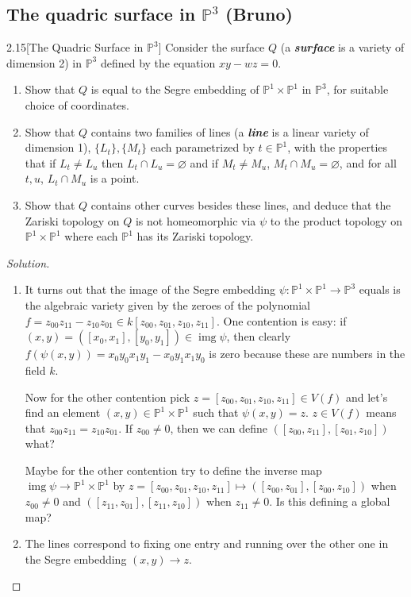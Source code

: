 \subsection{The quadric surface in $\mathbb{P}^3$ (Bruno)}

\begin{manualexercise}{2.15}[The Quadric Surface in $\mathbb{P}^3$]
	Consider the surface $Q$ (a \textbf{\textit{surface}} is a variety of dimension 2) in $\mathbb{P}^3$ defined by the equation $xy-wz=0$.
	\begin{enumerate}
		\item Show that $Q$ is equal to the Segre embedding of $\mathbb{P}^1\times\mathbb{P}^1$ in $\mathbb{P}^3$, for suitable choice of coordinates.
		\item Show that $Q$ contains two families of lines (a \textbf{\textit{line}} is a linear variety of dimension 1), $\{L_t\},\{M_t\}$ each parametrized by $t\in\mathbb{P}^1$, with the properties that if $L_t\neq L_u$ then $L_t\cap L_u=\varnothing$ and if $M_t\neq M_u$, $M_t\cap M_u=\varnothing$, and for all $t,u$, $L_t\cap M_u$ is a point.
		\item Show that $Q$ contains other curves besides these lines, and deduce that the Zariski topology on $Q$ is not homeomorphic via $\psi$ to the product topology on $\mathbb{P}^1\times \mathbb{P}^1$ where each $\mathbb{P}^1$ has its Zariski topology.
	\end{enumerate}
\end{manualexercise}

\begin{proof}[Solution]\leavevmode
	\begin{enumerate}
		\item It turns out that the image of the Segre embedding $\psi:\mathbb{P}^1\times\mathbb{P}^1\to\mathbb{P}^3$ equals is the algebraic variety given by the zeroes of the polynomial $f=z_{00}z_{11}-z_{10}z_{01}\in k[z_{00},z_{01},z_{10},z_{11}]$. One contention is easy: if $(x,y)=([x_0,x_1],[y_0,y_1])\in\operatorname{img}\psi$, then clearly $f(\psi(x,y))=x_0y_0x_1y_1-x_0y_1x_1y_0$ is zero because these are numbers in the field $k$.
		
		Now for the other contention pick $z=[z_{00},z_{01},z_{10},z_{11}]\in V(f)$ and let's find an element $(x,y)\in\mathbb{P}^1\times\mathbb{P}^1$ such that $\psi(x,y)=z$. $z\in V(f)$ means that $z_{00}z_{11}=z_{10}z_{01}$. If $z_{00}\neq0$, then we can define $([z_{00},z_{11}],[z_{01},z_{10}])$ {\color{magenta}what?}
		
		Maybe for the other contention try to define the inverse map $\operatorname{img}\psi\to\mathbb{P}^1\times\mathbb{P}^1$ by $z=[z_{00},z_{01},z_{10},z_{11}]\mapsto([z_{00},z_{01}],[z_{00},z_{10}])$ when $z_{00}\neq0$ and $([z_{11},z_{01}],[z_{11},z_{10}])$ when $z_{11}\neq0$. Is this defining a global map?
		
		\item The lines correspond to fixing one entry and running over the other one in the Segre embedding $(x,y)\to z$. 
	\end{enumerate}
\end{proof}

